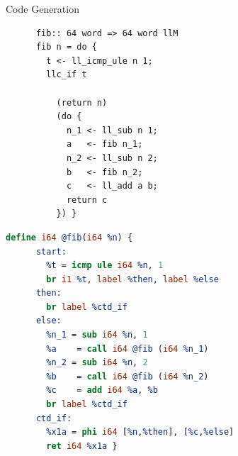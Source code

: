 \documentclass[fleqn]{beamer}
\begin{document}
\begin{frame}[fragile]{Code Generation}

  {\small\centering
  \begin{minipage}[t]{.35\textwidth}
    \begin{lstlisting}
      fib:: 64 word => 64 word llM
      fib n = do {
        t <- ll_icmp_ule n 1;
        llc_if t

          (return n)
          (do {
            n_1 <- ll_sub n 1;
            a   <- fib n_1;
            n_2 <- ll_sub n 2;
            b   <- fib n_2;
            c   <- ll_add a b;
            return c
          }) }
    \end{lstlisting}
  \end{minipage}
  \hfill\pause
  \begin{minipage}[t]{.57\textwidth}
    \begin{lstlisting}[language=LLVM, literate={}]
    define i64 @fib(i64 %n) {
      start:
        %t = icmp ule i64 %n, 1
        br i1 %t, label %then, label %else
      then:
        br label %ctd_if
      else:
        %n_1 = sub i64 %n, 1
        %a    = call i64 @fib (i64 %n_1)
        %n_2 = sub i64 %n, 2
        %b    = call i64 @fib (i64 %n_2)
        %c    = add i64 %a, %b
        br label %ctd_if
      ctd_if:
        %x1a = phi i64 [%n,%then], [%c,%else]
        ret i64 %x1a }
    \end{lstlisting}
  \end{minipage}
  }




\end{frame}
\end{document}
